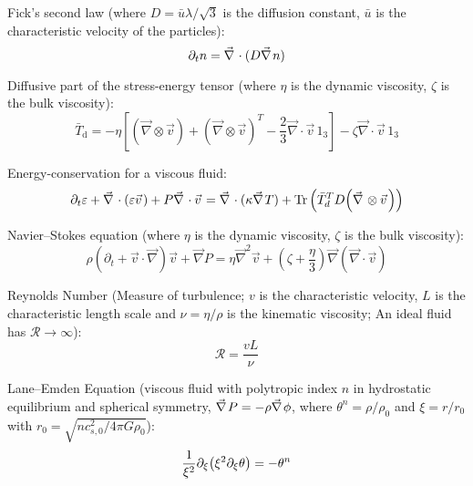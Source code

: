 			Fick's second law (where $D = \bar{u} \lambda/\sqrt{3}$ is the diffusion constant, $\bar{u}$ is the characteristic velocity of the particles):
			\begin{equation}
				\partial_t n = \Nabla \cdot (D \Nabla n)
			\end{equation}

			\noindent
			Diffusive part of the stress-energy tensor (where $\eta$ is the dynamic viscosity, $\zeta$ is the bulk viscosity):
			\begin{equation}
				\bar{T}_{\mathrm{d}}=-\eta\left[\left(\vec{\nabla}\otimes\vec{v}\right)+\left(\vec{\nabla}\otimes\vec{v}\right)^{T}-\frac{2}{3}\vec{\nabla}\cdot\vec{v}\,1_{3}\right]-\zeta\vec{\nabla}\cdot\vec{v}\,1_{3}
			\end{equation}

			\noindent
			Energy-conservation for a viscous fluid:
			\begin{equation}
				\partial_t \varepsilon + \Nabla \cdot (\varepsilon \vec{v}) + P \Nabla \cdot \vec{v} = \Nabla \cdot (\kappa \Nabla T) + \tr\qty(\bar{T}_d^T D \qty(\Nabla \otimes\vec{v}))
			\end{equation}

			\noindent
			Navier--Stokes equation (where $\eta$ is the dynamic viscosity, $\zeta$ is the bulk viscosity):
			\begin{equation}
				\rho\left(\partial_{t}+\vec{v}\cdot\vec{\nabla}\right)\vec{v}+\vec{\nabla}P=\eta\vec{\nabla}^{2}\vec{v}+\left(\zeta+\frac{\eta}{3}\right)\vec{\nabla}\left(\vec{\nabla}\cdot\vec{v}\right)
			\end{equation}

			\noindent
			Reynolds Number (Measure of turbulence; $v$ is the characteristic velocity, $L$ is the characteristic length scale and $\nu = \eta / \rho$ is the kinematic viscosity; An ideal fluid has $\mathcal{R} \to \infty$):
			\begin{equation}
				\mathcal{R} = \frac{v L}{\nu}
			\end{equation}

			\noindent
			Lane--Emden Equation (viscous fluid with polytropic index $n$ in hydrostatic equilibrium and spherical symmetry, \ie $\Nabla P = - \rho \Nabla \phi$, where $\theta^n = \rho/\rho_0$ and $\xi = r/r_0$ with $r_0 = \sqrt{n c_{s,0}^2 / 4\pi G \rho_0}$):
			\begin{equation}
				\frac{1}{\xi^2} \partial_\xi \qty(\xi^2 \partial_\xi \theta) = - \theta^n
			\end{equation}

